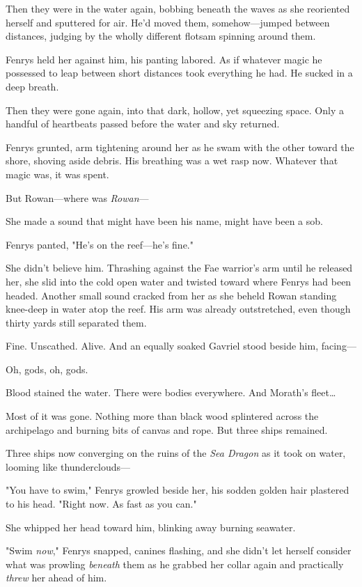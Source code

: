 Then they were in the water again, bobbing beneath the waves as she reoriented herself and sputtered for air.
He'd moved them, somehow---jumped between distances, judging by the wholly different flotsam spinning around them.

Fenrys held her against him, his panting labored.
As if whatever magic he possessed to leap between short distances took everything he had.
He sucked in a deep breath.

Then they were gone again, into that dark, hollow, yet squeezing space.
Only a handful of heartbeats passed before the water and sky returned.

Fenrys grunted, arm tightening around her as he swam with the other toward the shore, shoving aside debris.
His breathing was a wet rasp now.
Whatever that magic was, it was spent.

But Rowan---where was \emph{Rowan}---

She made a sound that might have been his name, might have been a sob.

Fenrys panted, "He's on the reef---he's fine."

She didn't believe him.
Thrashing against the Fae warrior's arm until he released her, she slid into the cold open water and twisted toward where Fenrys had been headed.
Another small sound cracked from her as she beheld Rowan standing knee-deep in water atop the reef.
His arm was already outstretched, even though thirty yards still separated them.

Fine.
Unscathed.
Alive.
And an equally soaked Gavriel stood beside him, facing---

Oh, gods, oh, gods.

Blood stained the water.
There were bodies everywhere.
And Morath's fleet\ldots{}

Most of it was gone.
Nothing more than black wood splintered across the archipelago and burning bits of canvas and rope.
But three ships remained.

Three ships now converging on the ruins of the \emph{Sea Dragon} as it took on water, looming like thunderclouds---

"You have to swim," Fenrys growled beside her, his sodden golden hair plastered to his head.
"Right now.
As fast as you can."

She whipped her head toward him, blinking away burning seawater.

"Swim \emph{now}," Fenrys snapped, canines flashing, and she didn't let herself consider what was prowling \emph{beneath} them as he grabbed her collar again and practically \emph{threw} her ahead of him.

